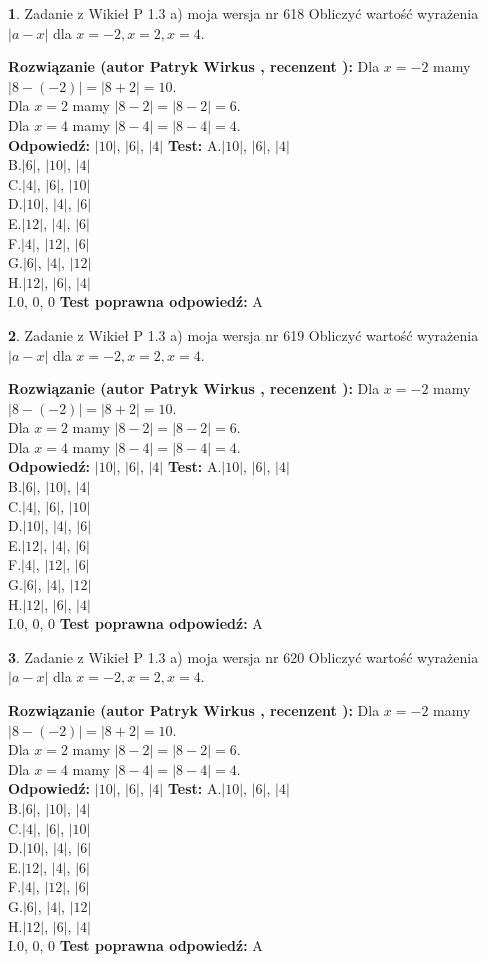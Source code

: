 \documentclass[12pt, a4paper]{article}
\theoremstyle{definition} %
\newtheorem{zad}{}
\newcommand{\zadStart}[1]{\begin{zad}#1\newline}
\newcommand{\zadStop}{\end{zad}}
\newcommand{\rozwStart}[2]{\noindent \textbf{Rozwiązanie (autor #1 , recenzent #2): }\newline}
\newcommand{\rozwStop}{\newline}
\newcommand{\odpStart}{\noindent \textbf{Odpowiedź:}\newline}
\newcommand{\odpStop}{\newline}
\newcommand{\testStart}{\noindent \textbf{Test:}\newline}
\newcommand{\testStop}{\newline}
\newcommand{\kluczStart}{\noindent \textbf{Test poprawna odpowiedź:}\newline}
\newcommand{\kluczStop}{\newline}
\begin{document}
\zadStart{Zadanie z Wikieł P 1.3 a) moja wersja nr 618}
Obliczyć wartość wyrażenia $|a - x|$ dla $x=-2,x=2,x=4$.
\zadStop
\rozwStart{Patryk Wirkus}{}
Dla $x = -2$ mamy $|8 - (-2)| = |8 + 2| = 10$.\\
Dla $x = 2$ mamy $|8 - 2| = |8 - 2| = 6$.\\
Dla $x = 4$ mamy $|8 - 4| = |8 - 4| = 4$.\\
\rozwStop
\odpStart
$|10|$, $|6|$, $|4|$
\odpStop
\testStart
A.$|10|$, $|6|$, $|4|$\\
B.$|6|$, $|10|$, $|4|$\\
C.$|4|$, $|6|$, $|10|$\\
D.$|10|$, $|4|$, $|6|$\\
E.$|12|$, $|4|$, $|6|$\\
F.$|4|$, $|12|$, $|6|$\\
G.$|6|$, $|4|$, $|12|$\\
H.$|12|$, $|6|$, $|4|$\\
I.$0$, $0$, $0$
\testStop
\kluczStart
A
\kluczStop



\zadStart{Zadanie z Wikieł P 1.3 a) moja wersja nr 619}
Obliczyć wartość wyrażenia $|a - x|$ dla $x=-2,x=2,x=4$.
\zadStop
\rozwStart{Patryk Wirkus}{}
Dla $x = -2$ mamy $|8 - (-2)| = |8 + 2| = 10$.\\
Dla $x = 2$ mamy $|8 - 2| = |8 - 2| = 6$.\\
Dla $x = 4$ mamy $|8 - 4| = |8 - 4| = 4$.\\
\rozwStop
\odpStart
$|10|$, $|6|$, $|4|$
\odpStop
\testStart
A.$|10|$, $|6|$, $|4|$\\
B.$|6|$, $|10|$, $|4|$\\
C.$|4|$, $|6|$, $|10|$\\
D.$|10|$, $|4|$, $|6|$\\
E.$|12|$, $|4|$, $|6|$\\
F.$|4|$, $|12|$, $|6|$\\
G.$|6|$, $|4|$, $|12|$\\
H.$|12|$, $|6|$, $|4|$\\
I.$0$, $0$, $0$
\testStop
\kluczStart
A
\kluczStop



\zadStart{Zadanie z Wikieł P 1.3 a) moja wersja nr 620}
Obliczyć wartość wyrażenia $|a - x|$ dla $x=-2,x=2,x=4$.
\zadStop
\rozwStart{Patryk Wirkus}{}
Dla $x = -2$ mamy $|8 - (-2)| = |8 + 2| = 10$.\\
Dla $x = 2$ mamy $|8 - 2| = |8 - 2| = 6$.\\
Dla $x = 4$ mamy $|8 - 4| = |8 - 4| = 4$.\\
\rozwStop
\odpStart
$|10|$, $|6|$, $|4|$
\odpStop
\testStart
A.$|10|$, $|6|$, $|4|$\\
B.$|6|$, $|10|$, $|4|$\\
C.$|4|$, $|6|$, $|10|$\\
D.$|10|$, $|4|$, $|6|$\\
E.$|12|$, $|4|$, $|6|$\\
F.$|4|$, $|12|$, $|6|$\\
G.$|6|$, $|4|$, $|12|$\\
H.$|12|$, $|6|$, $|4|$\\
I.$0$, $0$, $0$
\testStop
\kluczStart
A
\kluczStop
\end{document}
